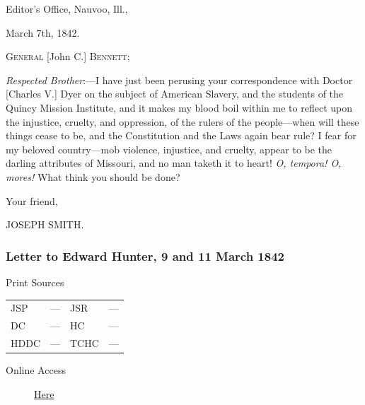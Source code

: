 				\begin{tightright}
					Editor's Office, Nauvoo, Ill.,

					March 7th, 1842.
				\end{tightright}

				\textsc{General} [John C.] \textsc{Bennett};

				\textit{Respected Brother}:---I have just been perusing your correspondence with Doctor [Charles V.] Dyer on the subject of American Slavery, and the students of the Quincy Mission Institute, and it makes my blood boil within me to reflect upon the injustice, cruelty, and oppression, of the rulers of the people---when will these things cease to be, and the Constitution and the Laws again bear rule? I fear for my beloved country---mob violence, injustice, and cruelty, appear to be the darling attributes of Missouri, and no man taketh it to heart! \textit{O, tempora! O, mores!} What think you should be done?

				\begin{tightright}
					Your friend,

					JOSEPH SMITH.
				\end{tightright}
				
		\subsubsection{Letter to Edward Hunter, 9 and 11 March 1842}
			\label{EMS-1842-JS-9-11-MAR-1842}
			
			\begin{description}
				\item[Print Sources]
			\end{description}

			\begin{tabular}{p{0.5in}p{1in}p{0.5in}p{1in}}
				JSP	 	& ---		& JSR 		& --- \\
				DC	 	& ---		& HC 		& --- \\
				HDDC 	& ---		& TCHC 		& --- \\
			\end{tabular}
			
			\begin{description}
				\item[Online Access] \href{https://www.josephsmithpapers.org/paper-summary/letter-to-edward-hunter-9-and-11-march-1842/1}{Here}
			\end{description}
			
